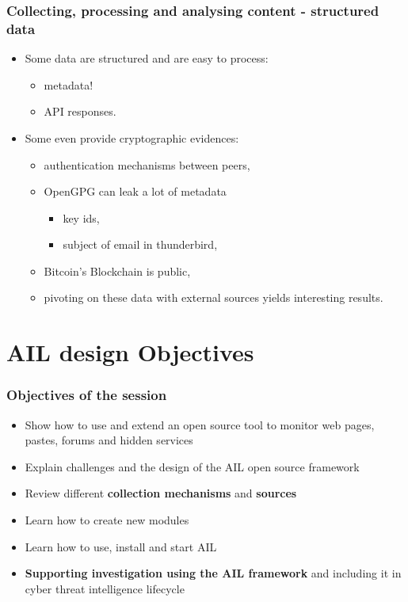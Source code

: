 \documentclass{beamer}
\begin{document}
\begin{frame}
        \frametitle{Collecting, processing and analysing content - structured data}
        \begin{itemize}
		\item Some data are structured and are easy to process:
        	\begin{itemize}
			\item metadata!
			\item API responses.
        	\end{itemize}
		\item Some even provide cryptographic evidences:
			        \begin{itemize}

         \item authentication mechanisms between peers,
         \item OpenGPG can leak a lot of metadata
        \begin{itemize}
          \item key ids,
          \item subject of email in thunderbird,
        \end{itemize}
          \item Bitcoin's Blockchain is public,
          \item pivoting on these data with external sources yields interesting results.
        \end{itemize}


        \end{itemize}
\end{frame}

\section{AIL design Objectives}
\begin{frame}
\frametitle{Objectives of the session}
    \begin{itemize}
        \item Show how to use and extend an open source tool to monitor web pages, pastes, forums and hidden services
        \item Explain challenges and the design of the AIL open source framework
        \item Review different {\bf collection mechanisms} and {\bf sources}
        \item Learn how to create new modules
        \item Learn how to use, install and start AIL
        \item {\bf Supporting investigation using the AIL framework} and including it in cyber threat intelligence lifecycle
    \end{itemize}
\end{frame}
\end{document}
